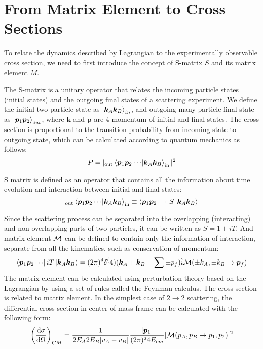  \section{From Matrix Element to Cross Sections}
 \label{sec:ME}
 To relate the dynamics described by Lagrangian to the experimentally observable cross section, we need to first introduce the concept of S-matrix $S$ and its matrix element $M$. 
 
 The S-matrix is a unitary operator that relates the incoming particle states (initial states) and the outgoing final states of a scattering experiment.  We define the initial two particle state as $\ket{\bm k_A\bm k_B}_{in}$, and outgoing many particle final state as $\ket{\bm p_1 \bm p_2}_{out}$, where $\bm k$ and $\bm p$ are 4-momentum of initial and final states. The cross section is proportional to the transition probability from incoming state to outgoing state, which can be calculated according to quantum mechanics as follows:
 \begin{equation}
 P=|_{\mathrm{out}}\braket{\bm p_1 \bm p_2 \cdots}{\bm k_A\bm k_B}_{\mathrm{in}}|^2
 \end{equation}
 
 S matrix is defined as an operator that contains all the information about time evolution and interaction between initial and final states:
 \begin{equation}
 _{\mathrm{out}}\braket{\bm p_1 \bm p_2 \cdots}{\bm k_A\bm k_B}_{\mathrm{in}} \equiv \bra{\bm p_1 \bm p_2 \cdots}S\ket{\bm k_A\bm k_B}
 \end{equation}
 
Since the scattering process can be separated into the overlapping (interacting)  and non-overlapping parts of two particles, it can be written as $S=1+iT$. And matrix element $\mathcal{M}$ can be defined to contain only the information of interaction, separate from all the kinematics, such as conservation of momentum:
 \begin{equation}
 \bra{\bm p_1 \bm p_2 \cdots}iT\ket{\bm k_A\bm k_B}=(2\pi)^4\delta^(4)(\bm k_A+\bm k_B-\sum \pm p_f)\dot i\mathcal{M}(\pm k_A,\pm k_B\rightarrow \bm p_f)
 \end{equation}
The matrix element can be calculated using perturbation theory based on the Lagrangian by using a set of rules called the Feynman calculus. The cross section is related to matrix element. In the simplest case of $2\rightarrow2$ scattering, the differential cross section in center of mass frame can be calculated with the following form:
 \begin{equation}
 \left(\frac{\mathrm{d} \sigma}{\mathrm{d} \Omega}\right)_{CM} = \frac{1}{2 E_A 2 E_B |v_A-v_B|}\frac{|\bm p_1|}{(2\pi)^2 4E_{cm}}|\mathcal{M}(p_A,p_B\rightarrow p_1,p_2)|^2
 \end{equation}
 
